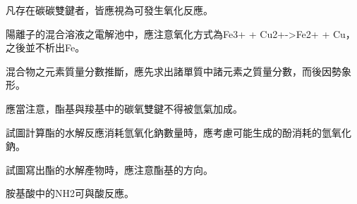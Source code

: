 \documentclass{ctexart}
\begin{document}
凡存在碳碳雙鍵者，皆應視為可發生氧化反應。
\par
陽離子的混合溶液之電解池中，應注意氧化方式為Fe3+ + Cu2+->Fe2+ + Cu，之後並不析出Fe。
\par
混合物之元素質量分數推斷，應先求出諸單質中諸元素之質量分數，而後因勢象形。
\par
應當注意，酯基與羧基中的碳氧雙鍵不得被氫氣加成。
\par
試圖計算酯的水解反應消耗氫氧化鈉數量時，應考慮可能生成的酚消耗的氫氧化鈉。
\par
試圖寫出酯的水解產物時，應注意酯基的方向。
\par
胺基酸中的NH2可與酸反應。
\end{document}
